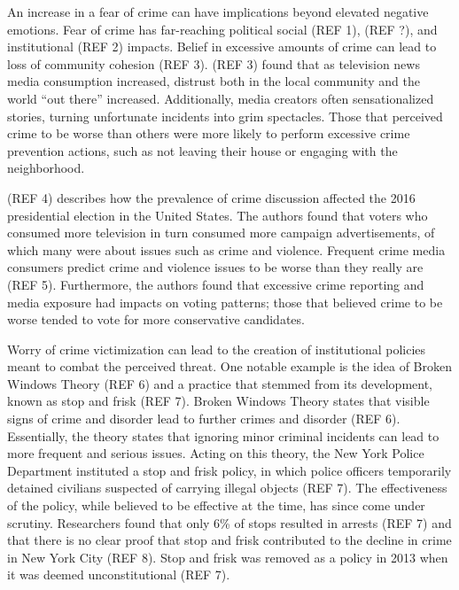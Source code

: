 \documentclass[12pt,oneside, letterpaper]{book}
\begin{document}
\par An increase in a fear of crime can have implications beyond elevated negative emotions. Fear of crime has far-reaching political social (REF 1), (REF ?), and institutional (REF 2) impacts. Belief in excessive amounts of crime can lead to loss of community cohesion (REF 3). (REF 3) found that as television news media consumption increased, distrust both in the local community and the world ``out there'' increased. Additionally, media creators often sensationalized stories, turning unfortunate incidents into grim spectacles. Those that perceived crime to be worse than others were more likely to perform excessive crime prevention actions, such as not leaving their house or engaging with the neighborhood.

\par (REF 4) describes how the prevalence of crime discussion affected the 2016 presidential election in the United States. The authors found that voters who consumed more television in turn consumed more campaign advertisements, of which many were about issues such as crime and violence. Frequent crime media consumers predict crime and violence issues to be worse than they really are (REF 5). Furthermore, the authors found that excessive crime reporting and media exposure had impacts on voting patterns; those that believed crime to be worse tended to vote for more conservative candidates.

\par Worry of crime victimization can lead to the creation of institutional policies meant to combat the perceived threat. One notable example is the idea of Broken Windows Theory (REF 6) and a practice that stemmed from its development, known as stop and frisk (REF 7). Broken Windows Theory states that visible signs of crime and disorder lead to further crimes and disorder (REF 6). Essentially, the theory states that ignoring minor criminal incidents can lead to more frequent and serious issues. Acting on this theory, the New York Police Department instituted a stop and frisk policy, in which police officers temporarily detained civilians suspected of carrying illegal objects (REF 7). The effectiveness of the policy, while believed to be effective at the time, has since come under scrutiny. Researchers found that only 6\% of stops resulted in arrests (REF 7) and that there is no clear proof that stop and frisk contributed to the decline in crime in New York City (REF 8). Stop and frisk was removed as a policy in 2013 when it was deemed unconstitutional (REF 7).
\end{document}
